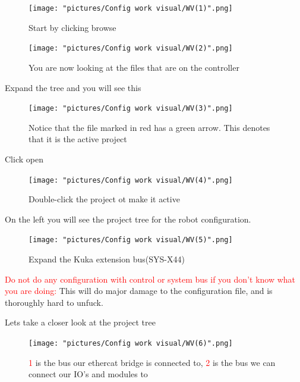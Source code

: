 \documentclass{article}
\begin{document}
\begin{figure}[!h]
    \centering
    \texttt{[image: "pictures/Config work visual/WV(1)".png]}
    \caption{Start by clicking browse}
    \label{fig:my_label}
\end{figure}

\newpage

\begin{figure}[!h]
    \centering
    \texttt{[image: "pictures/Config work visual/WV(2)".png]}
    \caption{You are now looking at the files that are on the controller}
    \label{fig:my_label}
\end{figure}

Expand the tree and you will see this

\begin{figure}[!h]
    \centering
    \texttt{[image: "pictures/Config work visual/WV(3)".png]}
    \caption{Notice that the file marked in red has a green arrow. This denotes that it is the active project}
    \label{fig:my_label}
\end{figure}

Click open

\begin{figure}[!h]
    \centering
    \texttt{[image: "pictures/Config work visual/WV(4)".png]}
    \caption{Double-click the project ot make it active}
    \label{fig:my_label}
\end{figure}

\newpage

On the left you will see the project tree for the robot configuration. 

\begin{figure}[!h]
    \centering
    \texttt{[image: "pictures/Config work visual/WV(5)".png]}
    \caption{Expand the Kuka extension bus(SYS-X44)}
    \label{fig:my_label}
\end{figure}



\textcolor{red}{Do not do any configuration with control or system bus if you don't know what you are doing:} This will do major damage to the configuration file, and is thoroughly hard to unfuck. 

\newpage

Lets take a closer look at the project tree

\begin{figure}[!h]
    \centering
    \texttt{[image: "pictures/Config work visual/WV(6)".png]}
    \caption{\textcolor{red}{1} is the bus our ethercat bridge is connected to, \textcolor{red}{2} is the bus we can connect our IO's and modules to}
    \label{fig:my_label}
\end{figure}
\end{document}
